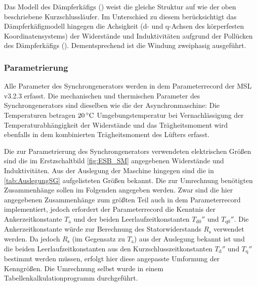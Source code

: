 Das Modell des Dämpferkäfigs () weist die gleiche Struktur auf
wie der oben beschriebene Kurzschlussläufer. Im Unterschied zu diesem
berücksichtigt das Dämpferkäfigmodell hingegen die Achsigkeit (d- und
q-Achsen des körperfesten Koordinatensystems) der Widerstände und
Induktivitäten aufgrund der Pollücken des Dämpferkäfigs
(\cite[S. 194]{kralModelicaObjektorientierteModellbildung2019}).
Dementsprechend ist die Windung zweiphasig ausgeführt.

\subsubsection{Parametrierung}\label{parametrierung-SG}

Alle Parameter des Synchrongenerators werden in dem Parameterrecord
der MSL v3.2.3 erfasst. Die mechanischen und thermischen Parameter des
Synchrongenerators sind dieselben wie die der Asynchronmaschine: Die
Temperaturen betragen \(\unit[20]{^\circ C}\) Umgebungstemperatur bei
Vernachlässigung der Temperaturabhängigkeit der Widerstände und das
Trägheitsmoment wird ebenfalls in dem kombinierten Trägheitsmoment des
Lüfters erfasst.

Die zur Parametrierung des Synchrongenerators verwendeten elektrischen Größen sind die im Erstzschaltbild \cref{fig:ESB_SM} angegebenen Widerstände und Induktivitäten. Aus der Auslegung der Maschine hingegen sind die in \cref{tab:AuslegungSG} aufgelisteten Größen bekannt. Die zur Umrechnung benötigten Zusammenhänge sollen im Folgenden angegeben werden. Zwar sind die hier angegebenen Zusammenhänge zum größten Teil auch in dem Parameterrecord  implementiert, jedoch erfordert der Parameterrecord die Kenntnis der Ankerzeitkonstante \(T_{\mathrm{a}}\) und der beiden Leerlaufzeitkonstanten $T_{\mathrm{d0}}''$ und $T_{\mathrm{q0}}''$. Die Ankerzeitkonstante würde zur Berechnung des Statorwiderstands $R_{\mathrm{s}}$ verwendet werden. Da jedoch \(R_{\mathrm{s}}\) (im Gegensatz zu \(T_{\mathrm{a}}\)) aus der Auslegung bekannt ist und die beiden Leerlaufzeitkonstanten aus den Kurzschlusszeitkonstanten $T_{\mathrm{d}}''$ und $T_{\mathrm{q}}''$ bestimmt werden müssen, erfolgt hier diese angepasste Umformung der Kenngrößen. Die Umrechnung selbst wurde in einem Tabellenkalkulationprogramm durchgeführt.

